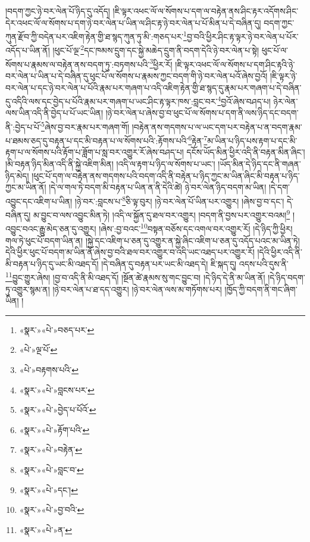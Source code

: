 །བདག་ཀྱང་ཉེ་བར་ལེན་པོ་ཉིད་དུ་འདོད། །ཇི་ལྟར་འཕང་ལོ་ལ་སོགས་པ་དག་ལ་བརྟེན་ནས་ཤིང་རྟར་འདོགས་ཤིང་དེར་འཕང་ལོ་ལ་སོགས་པ་དག་ཉེ་བར་ལེན་པ་ཡིན་ལ་ཤིང་རྟ་ཉེ་བར་ལེན་པ་པོ་མིན་པ་དེ་བཞིན་དུ། བདག་ཀྱང་ཀུན་རྫོབ་ཀྱི་བདེན་པར་འཇིག་རྟེན་གྱི་ཐ་སྙད་ཀུན་ཏུ་མི་:གཅད་པར་\footnote{«སྣར་»«པེ་»བཅད་པར་}བྱ་བའི་ཕྱིར་ཤིང་རྟ་ལྟར་ཉེ་བར་ལེན་པ་པོར་འདོད་པ་ཡིན་ནོ། །ཕུང་པོ་ལྔ་\footnote{«པེ་»ལྔ་པོ་}དང་ཁམས་དྲུག་དང་སྐྱེ་མཆེད་དྲུག་ནི་བདག་དེའི་ཉེ་བར་ལེན་པ་སྟེ། ཕུང་པོ་ལ་སོགས་པ་རྣམས་ལ་བརྟེན་ནས་བདག་ཏུ་:བཏགས་པའི་\footnote{«པེ་»བརྟགས་པའི་}ཕྱིར་རོ། །ཇི་ལྟར་འཕང་ལོ་ལ་སོགས་པ་དག་ཤིང་རྟའི་ཉེ་བར་ལེན་པ་ཡིན་པ་དེ་བཞིན་དུ་ཕུང་པོ་ལ་སོགས་པ་རྣམས་ཀྱང་བདག་གི་ཉེ་བར་ལེན་པའོ་ཞེས་བྱའོ། །ཇི་ལྟར་ཉེ་བར་ལེན་པ་དང་ཉེ་བར་ལེན་པ་པོའི་རྣམ་པར་གཞག་པ་འདི་འཇིག་རྟེན་གྱི་ཐ་སྙད་དུ་རྣམ་པར་གཞག་པ་དེ་བཞིན་དུ་འདིའི་ལས་དང་བྱེད་པ་པོའི་རྣམ་པར་གཞག་པ་ཡང་ཤིང་རྟ་ལྟར་ཁས་:བླང་བར་\footnote{«སྣར་»«པེ་»བླངས་པར་}བྱའོ་ཞེས་བཤད་པ། ཉེར་ལེན་ལས་ཡིན་འདི་ནི་བྱེད་པ་པོ་ཡང་ཡིན། །ཉེ་བར་ལེན་པ་ཞེས་བྱ་བ་ཕུང་པོ་ལ་སོགས་པ་དག་ནི་ལས་ཉིད་དང་བདག་ནི་:བྱེད་པ་པོ་\footnote{«སྣར་»«པེ་»བྱེད་པ་པོའོ་}ཞེས་བྱ་བར་རྣམ་པར་གཞག་གོ། །བརྟེན་ནས་གདགས་པ་ལ་ཡང་དག་པར་བརྟེན་པ་ན་བདག་རྣམ་པ་ཐམས་ཅད་དུ་བརྟན་པ་དང་མི་བརྟན་པ་ལ་སོགས་པའི་:རྟོགས་པའི་\footnote{«སྣར་»«པེ་»རྟོག་པའི་}རྟེན་\footnote{«སྣར་»«པེ་»བརྟེན་}མ་ཡིན་པ་ཉིད་པས་རྟག་པ་དང་མི་རྟག་པ་ལ་སོགས་པའི་རྟོག་པ་ཟློག་པ་སླ་བར་འགྱུར་རོ་ཞེས་བཤད་པ། དངོས་ཡོད་མིན་ཕྱིར་འདི་ནི་བརྟན་མིན་ཞིང་། །མི་བརྟན་ཉིད་མིན་འདི་ནི་སྐྱེ་འཇིག་མིན། །འདི་ལ་རྟག་པ་ཉིད་ལ་སོགས་པ་ཡང་། །ཡོད་མིན་དེ་ཉིད་དང་ནི་གཞན་ཉིད་མེད། །ཕུང་པོ་དག་ལ་བརྟེན་ནས་གདགས་པའི་བདག་འདི་ནི་བརྟེན་པ་ཉིད་ཀྱང་མ་ཡིན་ཞིང་མི་བརྟན་པ་ཉིད་ཀྱང་མ་ཡིན་ནོ། །དེ་ལ་གལ་ཏེ་བདག་མི་བརྟན་པ་ཡིན་ན་ནི་དེའི་ཚེ། ཉེ་བར་ལེན་ཉིད་བདག་མ་ཡིན། །དེ་དག་འབྱུང་དང་འཇིག་པ་ཡིན། །ཉེ་བར་:བླངས་པ་\footnote{«སྣར་»«པེ་»བླང་བ་}ཅི་ལྟ་བུར། །ཉེ་བར་ལེན་པོ་ཡིན་པར་འགྱུར། །ཞེས་བྱ་བ་དང་། དེ་བཞིན་དུ། མ་བྱུང་བ་ལས་འབྱུང་མིན་ཏེ། །འདི་ལ་སྐྱོན་དུ་ཐལ་བར་འགྱུར། །བདག་ནི་བྱས་པར་འགྱུར་བའམ།\footnote{«སྣར་»«པེ་»དང་།} །འབྱུང་བའང་རྒྱུ་མེད་ཅན་དུ་འགྱུར། །ཞེས་:བྱ་བའང་\footnote{«སྣར་»«པེ་»བྱ་བའི་}བསྟན་བཅོས་དང་འགལ་བར་འགྱུར་རོ། །དེ་ཉིད་ཀྱི་ཕྱིར། གལ་ཏེ་ཕུང་པོ་བདག་ཡིན་ན། །སྐྱེ་དང་འཇིག་པ་ཅན་དུ་འགྱུར་ན་སྐྱེ་ཞིང་འཇིག་པ་ཅན་དུ་འདོད་པའང་མ་ཡིན་ཏེ། དེའི་ཕྱིར་ཕུང་པོ་བདག་མ་ཡིན་ནོ་ཞེས་བྱ་བའི་ཐལ་བར་འགྱུར་བ་འདི་ཡང་འཐད་པར་འགྱུར་རོ། །དེའི་ཕྱིར་འདི་ནི་མི་བརྟན་པ་ཉིད་དུ་ཡང་མི་འཐད་དོ། །དེ་བཞིན་དུ་བརྟན་པར་ཡང་མི་འཐད་དེ། ཇི་སྐད་དུ། འདས་པའི་དུས་ནི་\footnote{«སྣར་»«པེ་»ན་}བྱུང་གྱུར་ཞེས། །བྱ་བ་འདི་ནི་མི་འཐད་དོ། །སྔོན་ཚེ་རྣམས་སུ་གང་བྱུང་བ། །དེ་ཉིད་དེ་ནི་མ་ཡིན་ནོ། །དེ་ཉིད་བདག་ཏུ་འགྱུར་སྙམ་ན། །ཉེ་བར་ལེན་པ་ཐ་དད་འགྱུར། །ཉེ་བར་ལེན་ལས་མ་གཏོགས་པར། །ཁྱོད་ཀྱི་བདག་ནི་གང་ཞིག་ཡིན། །
